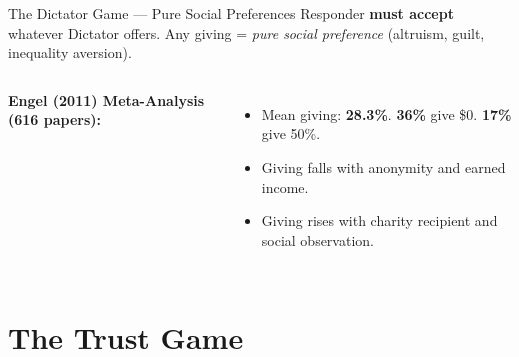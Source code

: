 \documentclass[aspectratio=169]{beamer}
\begin{document}
\begin{frame}{The Dictator Game --- Pure Social Preferences}
Responder \textbf{must accept} whatever Dictator offers. Any giving = \textit{pure social preference} (altruism, guilt, inequality aversion).
\begin{columns}
\textcolor{beblue}{\textbf{Engel (2011) Meta-Analysis (616 papers):}}
\begin{itemize}\small
  \item Mean giving: \textbf{28.3\%}. \textbf{36\%} give \$0. \textbf{17\%} give 50\%.
  \item Giving falls with anonymity and earned income.
  \item Giving rises with charity recipient and social observation.
\end{itemize}
\end{columns}
\end{frame}

\section{The Trust Game}
\end{document}
